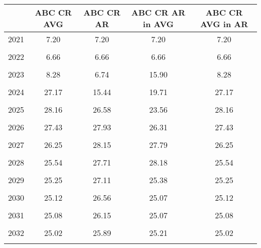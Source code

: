 \begin{tabular}{l*{4}{c}}
\hline\hline
                &ABC CR AVG&ABC CR AR&ABC CR AR in AVG&ABC CR AVG in AR\\
\hline
2021            &     7.20&     7.20&     7.20&     7.20\\
                &         &         &         &         \\
2022            &     6.66&     6.66&     6.66&     6.66\\
                &         &         &         &         \\
2023            &     8.28&     6.74&    15.90&     8.28\\
                &         &         &         &         \\
2024            &    27.17&    15.44&    19.71&    27.17\\
                &         &         &         &         \\
2025            &    28.16&    26.58&    23.56&    28.16\\
                &         &         &         &         \\
2026            &    27.43&    27.93&    26.31&    27.43\\
                &         &         &         &         \\
2027            &    26.25&    28.15&    27.79&    26.25\\
                &         &         &         &         \\
2028            &    25.54&    27.71&    28.18&    25.54\\
                &         &         &         &         \\
2029            &    25.25&    27.11&    25.38&    25.25\\
                &         &         &         &         \\
2030            &    25.12&    26.56&    25.07&    25.12\\
                &         &         &         &         \\
2031            &    25.08&    26.15&    25.07&    25.08\\
                &         &         &         &         \\
2032            &    25.02&    25.89&    25.21&    25.02\\
                &         &         &         &         \\
\hline\hline
\end{tabular}
